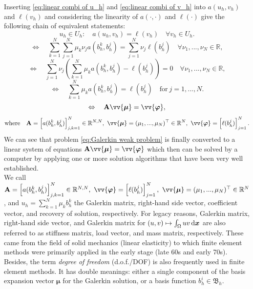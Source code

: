 	Inserting \eqref{eq:linear combi of u_h} and \eqref{eq:linear combi of v_h}
	into $a(u_h,v_h)$ and $\ell(v_h)$ and considering the linearity of 
	$a(\cdot,\cdot)$ and $\ell(\cdot)$ give the following chain of
	equivalent statements:
	\begin{equation}\label{eq:Galerkin weak problem}
	u_h\in U_h:\quad a(u_h,v_h)=\ell(v_h) \quad \forall v_h\in U_h.
	\end{equation}
	\begin{equation}	
	\Leftrightarrow\quad
	\sum_{k=1}^{N}\sum_{j=1}^{N}\mu_k\nu_j a(b_h^k,b_h^j)=
	\sum_{j=1}^{N}\nu_j\ell(b_h^j)
	\quad\forall \nu_1,...,\nu_N\in\mathbb{R},
	\end{equation}
	\begin{equation}	
	\Leftrightarrow\quad
	\sum_{j=1}^{N}\nu_j\left(\sum_{k=1}^{N}\mu_k a(b_h^k,b_h^j)-\ell(b_h^j) 
	\right)=0 \quad\forall \nu_1,...,\nu_N\in\mathbb{R},
	\end{equation}
	\begin{equation}
	\Leftrightarrow\quad
	\sum_{k=1}^{N}\mu_k a(b_h^k,b_h^j)=\ell(b_h^j)
	\quad \textrm{for}\ j=1,...,N.
	\end{equation}
	\begin{equation}\label{eq:linear systems of equations}
	\Leftrightarrow\quad
	\bA\vv{\bm{\mu}}=\vv{\bm{\varphi}},
	\end{equation}\vspace{-12pt}
	\begin{equation}\label{eq:linear systems of equations formulas}
	\textrm{where}\quad
	\bA=\left[a(b_h^k,b_h^j)\right]_{j,k=1}^{N}\in\mathbb{R}^{N,N},\
	\vv{\bm{\mu}}=(\mu_1,...,\mu_N)^\top\in\mathbb{R}^N,\
	\vv{\bm{\varphi}}=\left[\ell(b_h^j)\right]_{j=1}^{N}.
	\end{equation}
	We can see that problem \eqref{eq:Galerkin weak problem} is finally 
	converted to a linear system of equations 
	$\bA\vv{\bm{\mu}}=\vv{\bm{\varphi}}$ which 
	then can be solved by a computer by applying one or more solution 
	algorithms that have been very well established.\\
	
	We call
	$\bA=\left[a(b_h^k,b_h^j)\right]_{j,k=1}^{N}\in\mathbb{R}^{N,N},\ 
	\vv{\bm{\varphi}}=\left[\ell(b_h^j)\right]_{j=1}^{N},\ 
	\vv{\bm{\mu}}=(\mu_1,...,\mu_N)^\top\in\mathbb{R}^N$, and
	$u_h=\sum_{k=1}^{N}\mu_k b_h^k$ the Galerkin matrix, right-hand side
	vector, coefficient vector, and recovery of solution, respectively.
	For legacy reasons, Galerkin matrix, right-hand side vector, and Galerkin
	matrix for $(u,v)\mapsto\int_{\Omega}uv\,\mathrm{d}\bm{x}$ are also referred to as 
	stiffness matrix, load vector, and mass matrix, respectively. These came 
	from the field of solid mechanics (linear elasticity) to which finite 
	element methods were primarily applied in the early stage (late 60s and 
	early 70s). Besides, the term \emph{degree of freedom} (d.o.f./DOF) is 
	also frequently used in finite element methods. It has double meanings: 
	\circled{1} either a single component of the basis expansion vector
	$\bm{\mu}$ for the Galerkin solution, \circled{2} or a basis function 
	$b_h^i\in\mathfrak{B}_h$.
	
